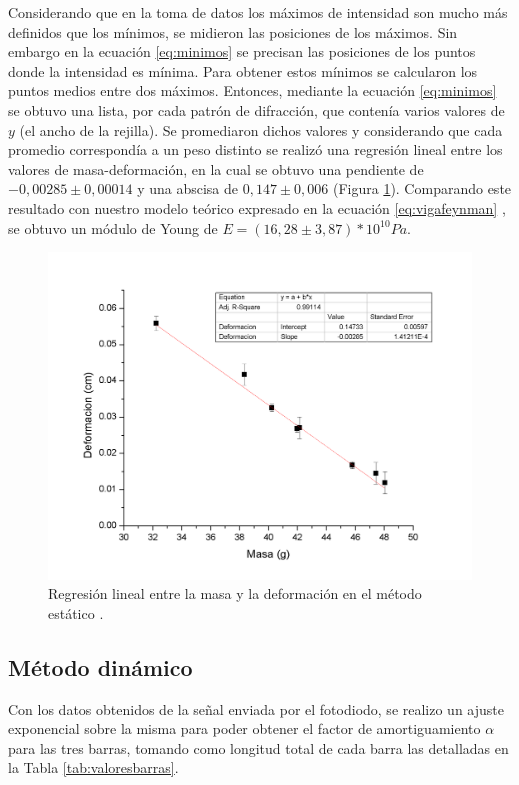 \documentclass[twoside,twocolumn,a4paper]{article}
\begin{document}
Considerando que en la toma de datos los m\'aximos de intensidad son mucho m\'as definidos que los m\'inimos, se midieron las posiciones de los m\'aximos. Sin embargo en la ecuaci\'on \ref{eq:minimos} se precisan las posiciones de los puntos donde la intensidad es m\'inima. Para obtener estos m\'inimos se calcularon los puntos medios entre dos m\'aximos. Entonces, mediante la ecuaci\'on \ref{eq:minimos} se obtuvo una lista, por cada patr\'on de difracci\'on, que conten\'ia varios valores de $y$ (el ancho de la rejilla). Se promediaron dichos valores y considerando que cada promedio correspond\'ia a un peso distinto se realiz\'o una regresi\'on lineal entre los valores de masa-deformaci\'on, en la cual se obtuvo una pendiente de $-0,00285 \pm 0,00014 $ y una abscisa de $0,147 \pm 0,006$ (Figura \ref{fig:regrlin}). Comparando este resultado con nuestro modelo te\'orico expresado en la ecuaci\'on \ref{eq:vigafeynman} , se obtuvo un m\'odulo de Young de $E = (16,28 \pm 3,87) * 10^{10} Pa$.

\begin{figure}[H]
\includegraphics[width=\linewidth]{regrlin.png}
\caption{Regresi\'on lineal entre la masa y la deformaci\'on en el m\'etodo est\'atico .}
\label{fig:regrlin}
\end{figure}


\subsection{M\'etodo din\'amico}

Con los datos obtenidos de la se\~nal enviada por el fotodiodo, se realizo un ajuste exponencial sobre la misma para poder obtener el factor de amortiguamiento $\alpha$ para las tres barras, tomando como longitud total de cada barra las detalladas en la Tabla \ref{tab:valoresbarras}. \newline
\end{document}
